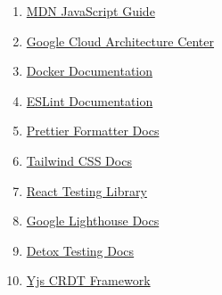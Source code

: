 \documentclass[12pt,a4paper]{report}
\begin{document}
\begin{enumerate}[label=\arabic*., leftmargin=*]
  \item \href{https://developer.mozilla.org/en-US/docs/Web/JavaScript/Guide}{MDN JavaScript Guide}\label{res:mdn}
  \item \href{https://cloud.google.com/architecture}{Google Cloud Architecture Center}\label{res:gcp}
  \item \href{https://docs.docker.com}{Docker Documentation}\label{res:docker}
  \item \href{https://eslint.org/docs/latest}{ESLint Documentation}\label{res:eslint}
  \item \href{https://prettier.io/docs/en/index.html}{Prettier Formatter Docs}\label{res:prettier}
  \item \href{https://tailwindcss.com/docs}{Tailwind CSS Docs}\label{res:tailwind}
  \item \href{https://testing-library.com/docs/react-testing-library/intro}{React Testing Library}\label{res:reacttestinglibrary}
  \item \href{https://developer.chrome.com/docs/lighthouse/}{Google Lighthouse Docs}\label{res:lighthouse}
  \item \href{https://wix.github.io/Detox/docs/api}{Detox Testing Docs}\label{res:detox}
  \item \href{https://yjs.dev/}{Yjs CRDT Framework}\label{res:crdt}
\end{enumerate}
\end{document}
